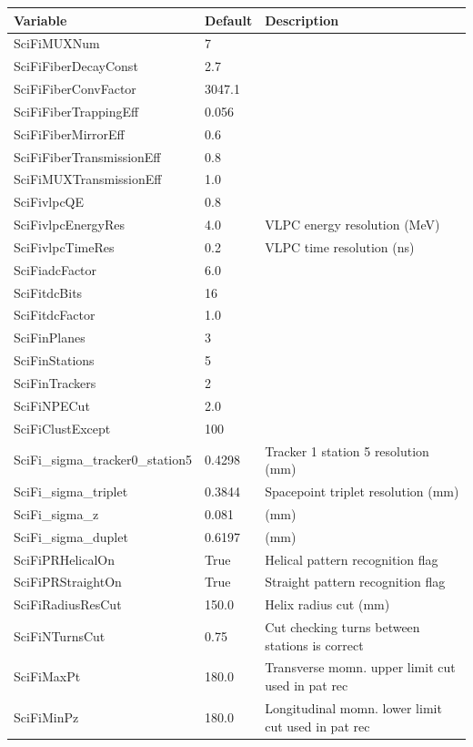 \renewcommand{\arraystretch}{1.0}
\begin{tabular}{| l | l | p{8cm} |}
  \hline                       
  \textbf{Variable} & \textbf{Default}& \textbf{Description}  \\
  \hline
  SciFiMUXNum & 7 & \\
  SciFiFiberDecayConst & 2.7 & \\
  SciFiFiberConvFactor & 3047.1 & \\
  SciFiFiberTrappingEff & 0.056 & \\
  SciFiFiberMirrorEff & 0.6 & \\
  SciFiFiberTransmissionEff & 0.8 & \\
  SciFiMUXTransmissionEff & 1.0 & \\
  SciFivlpcQE & 0.8 & \\
  SciFivlpcEnergyRes & 4.0 & VLPC energy resolution (MeV) \\
  SciFivlpcTimeRes & 0.2 & VLPC time resolution (ns) \\
  SciFiadcFactor & 6.0 & \\
  SciFitdcBits & 16 & \\
  SciFitdcFactor & 1.0 & \\
  SciFinPlanes & 3 & \\
  SciFinStations & 5 & \\
  SciFinTrackers & 2 & \\
  SciFiNPECut & 2.0 & \\
  SciFiClustExcept & 100 & \\
  SciFi\_sigma\_tracker0\_station5 & 0.4298 & Tracker 1 station 5 resolution (mm) \\
  SciFi\_sigma\_triplet & 0.3844 & Spacepoint triplet resolution (mm) \\
  SciFi\_sigma\_z & 0.081 & (mm) \\
  SciFi\_sigma\_duplet & 0.6197 & (mm) \\
  SciFiPRHelicalOn & True & Helical pattern recognition flag \\
  SciFiPRStraightOn  & True & Straight pattern recognition flag \\
  SciFiRadiusResCut & 150.0 & Helix radius cut (mm) \\
  SciFiNTurnsCut & 0.75 & Cut checking turns between stations is correct \\
  SciFiMaxPt & 180.0 & Transverse momn. upper limit cut used in pat rec \\
  SciFiMinPz & 180.0 & Longitudinal momn. lower limit cut used in pat rec \\

\end{tabular}
